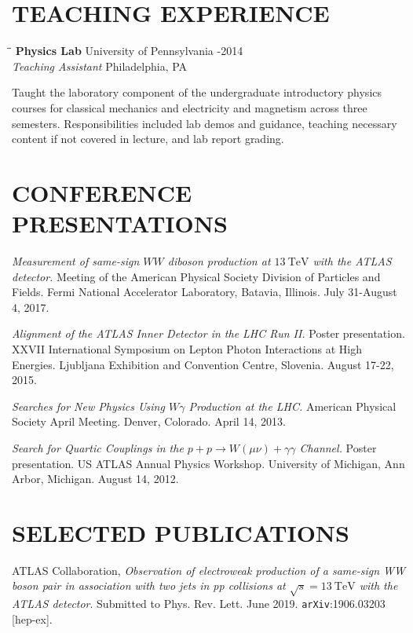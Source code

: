 \documentclass{res}
\begin{document}
\begin{resume}
\section{TEACHING EXPERIENCE}\vspace{-5pt}
   \begin{tabbing}
     \hspace{2.5in}\= \hspace{2.9in}\= \kill %
    {\bf Physics Lab} \>University of Pennsylvania     -2014\\
    {\it Teaching Assistant}  \>Philadelphia, PA
   \end{tabbing}\vspace{-18pt}      %
   Taught the laboratory component of the undergraduate introductory physics courses for classical mechanics and electricity and magnetism across three semesters.
   Responsibilities included lab demos and guidance, teaching necessary content if not covered in lecture, and lab report grading.

\section{CONFERENCE PRESENTATIONS}
    {\it Measurement of same-sign $WW$ diboson production at $13~\textrm{TeV}$ with the ATLAS detector.} Meeting of the American Physical Society Division of Particles and Fields.  Fermi National Accelerator Laboratory, Batavia, Illinois. July 31-August 4, 2017.

    {\it Alignment of the ATLAS Inner Detector in the LHC Run II.} Poster presentation.  XXVII International Symposium on Lepton Photon Interactions at High Energies. Ljubljana Exhibition and Convention Centre, Slovenia.  August 17-22, 2015.

    {\it Searches for New Physics Using $W\gamma$ Production at the LHC.} American Physical Society April Meeting. Denver, Colorado. April 14, 2013.

    {\it Search for Quartic Couplings in the $p+p\rightarrow W(\mu\nu)+\gamma\gamma$ Channel.} Poster presentation. US ATLAS Annual Physics Workshop. University of Michigan, Ann Arbor, Michigan.  August 14, 2012.

\section{SELECTED PUBLICATIONS}
    ATLAS Collaboration, {\it Observation of electroweak production of a same-sign WW boson pair in association with two jets in pp collisions at $\sqrt{s}=13~\textrm{TeV}$ with the ATLAS detector}. Submitted to Phys. Rev. Lett. June 2019. {\tt arXiv}:1906.03203 [hep-ex].


\end{resume}
\end{document}
